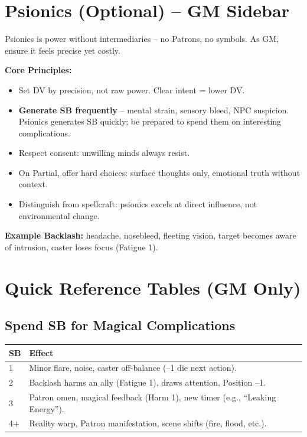 \section{Psionics (Optional) -- GM Sidebar}
\label{sec:psionics-gm}

\begin{tcolorbox}[
  title={Adjudicating Psionics},
  colback=gray!6,
  colframe=black,
  fonttitle=\bfseries
,breakable]
Psionics is power without intermediaries -- no Patrons, no symbols. As GM, ensure it feels precise yet costly.

\medskip
\noindent\textbf{Core Principles:}
\begin{itemize}
  \item Set DV by precision, not raw power. Clear intent = lower DV.
  \item \textbf{Generate SB frequently} -- mental strain, sensory bleed, NPC suspicion. Psionics generates SB quickly; be prepared to spend them on interesting complications.
  \item Respect consent: unwilling minds always resist.
  \item On Partial, offer hard choices: surface thoughts only, emotional truth without context.
  \item Distinguish from spellcraft: psionics excels at direct influence, not environmental change.
\end{itemize}

\noindent\textbf{Example Backlash:} headache, nosebleed, fleeting vision, target becomes aware of intrusion, caster loses focus (Fatigue 1).
\end{tcolorbox}

\section{Quick Reference Tables (GM Only)}
\label{sec:magic-quickref}

\subsection*{Spend SB for Magical Complications}
\begin{center}
\begin{tabular}{ll}
\toprule
\textbf{SB} & \textbf{Effect} \\
\midrule
1 & Minor flare, noise, caster off-balance (--1 die next action). \\
2 & Backlash harms an ally (Fatigue 1), draws attention, Position --1. \\
3 & Patron omen, magical feedback (Harm 1), new timer (e.g., ``Leaking Energy''). \\
4+ & Reality warp, Patron manifestation, scene shifts (fire, flood, etc.). \\
\bottomrule
\end{tabular}
\end{center}

